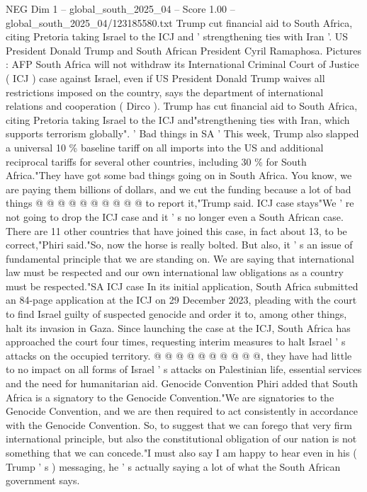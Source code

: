 \begin{textsample}{NEG Dim 1 – global\_south\_2025\_04 – Score 1.00 – global\_south\_2025\_04/123185580.txt}  \label{ex:f1_neg_133}
Trump cut financial aid to South Africa, citing Pretoria taking Israel to the ICJ and ' strengthening ties with Iran '.
US President Donald Trump and South African President Cyril Ramaphosa.
Pictures : AFP South Africa will not withdraw its International Criminal Court of Justice ( ICJ ) case against Israel, even if US President Donald Trump waives all restrictions imposed on the country, says the department of international relations and cooperation ( Dirco ).
Trump has cut financial aid to South Africa, citing Pretoria taking Israel to the ICJ and"strengthening ties with Iran, which supports terrorism globally". ' Bad things in SA ' This week, Trump also slapped a universal 10 \% baseline tariff on all imports into the US and additional reciprocal tariffs for several other countries, including 30 \% for South Africa."They have got some bad things going on in South Africa.
You know, we are paying them billions of dollars, and we cut the funding because a lot of bad things @ @ @ @ @ @ @ @ @ @ to report it,"Trump said.
ICJ case stays"We ' re not going to drop the ICJ case and it ' s no longer even a South African case.
There are 11 other countries that have joined this case, in fact about 13, to be correct,"Phiri said."So, now the horse is really bolted.
But also, it ' s an issue of fundamental principle that we are standing on.
We are saying that international law must be respected and our own international law obligations as a country must be respected."SA ICJ case In its initial application, South Africa submitted an 84-page application at the ICJ on 29 December 2023, pleading with the court to find Israel guilty of suspected genocide and order it to, among other things, halt its invasion in Gaza.
Since launching the case at the ICJ, South Africa has approached the court four times, requesting interim measures to halt Israel ' s attacks on the occupied territory. @ @ @ @ @ @ @ @ @ @, they have had little to no impact on all forms of Israel ' s attacks on Palestinian life, essential services and the need for humanitarian aid.
Genocide Convention Phiri added that South Africa is a signatory to the Genocide Convention."We are signatories to the Genocide Convention, and we are then required to act consistently in accordance with the Genocide Convention.
So, to suggest that we can forego that very firm international principle, but also the constitutional obligation of our nation is not something that we can concede."I must also say I am happy to hear even in his ( Trump ' s ) messaging, he ' s actually saying a lot of what the South African government says.

\end{textsample}
